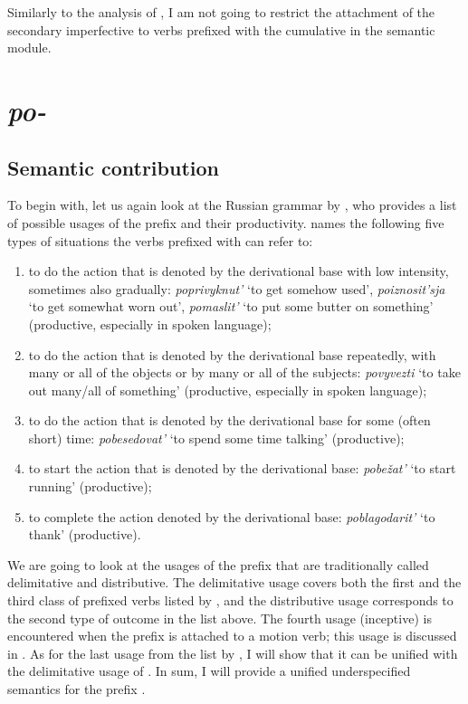 Similarly to the analysis of , I am not going to restrict the attachment of the secondary imperfective to verbs prefixed with the cumulative  in the semantic module.

\section{\textit{po-}}\label{subsection:semantics:po}
\subsection{Semantic contribution} To begin with, let us again look at the Russian grammar by \citet{Shvedova:82}, who provides a list of possible usages of the prefix  and their productivity. \citet[364--365]{Shvedova:82} names the following five types of situations the verbs prefixed with  can refer to:
\begin{enumerate}
\item to do the action that is denoted by the derivational base with low intensity, sometimes also gradually: \textit{poprivyknut'} `to get somehow used', \textit{po\-izno\-sit'sja} `to get somewhat worn out', \textit{pomaslit'} `to put some butter on something'  (productive, especially in spoken language);
\item to do the action that is denoted by the derivational base repeatedly, with many or all of the objects or by many or all of the subjects: \textit{povyvezti} `to take out many/all of something' (productive, especially in spoken language);
\item to do the action that is denoted by the derivational base for some (often short) time: \textit{pobesedovat'} `to spend some time talking' (productive);
\item to start the action that is denoted by the derivational base: \textit{pobe\v{z}at'} `to start running' (productive);
\item to complete the action denoted by the derivational base: \textit{poblagodarit'} `to thank' (productive).
\end{enumerate}

We are going to look at the usages of the prefix  that are traditionally called delimitative and distributive. The delimitative usage covers both the first and the third class of prefixed verbs listed by \citet{Shvedova:82}, and the distributive usage corresponds to the second type of outcome in the list above. The fourth usage (inceptive) is encountered when the prefix  is attached to a motion verb; this usage is discussed in \citealt{ZinovaOsswald:paper}. As for the last usage from the list by \citet{Shvedova:82}, I will show that it can be unified with the delimitative usage of . In sum, I will provide a unified underspecified semantics for the prefix .

